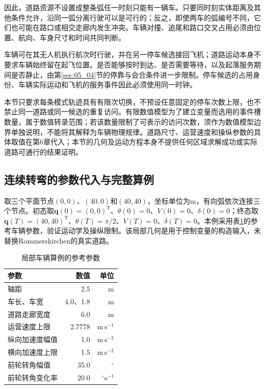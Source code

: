 因此，道路资源不设置成整条弧任一时刻只能有一辆车。只要同时刻实体距离及其他条件允许，沿同一弧分离行驶可以是可行的；反之，即使两车的弧编号不同，它们也可能在路口或相交走廊内发生冲突。车辆对撞、追尾和路口交叉占用必须由位置、航向、车身尺寸和时间共同判断。

车辆可在其无人机执行航次时行驶，并在另一停车候选接回飞机；道路运动本身不要求车辆始终留在起飞位置。是否能够按时到达、是否需要等待，以及起落服务期间是否静止，由第\ref{sec:05_04}节的停靠与会合条件进一步限制。停车候选的占用身份、车辆实际运动和飞机的服务事件因此必须使用同一时钟。

本节只要求每条模式轨迹具有有限次切换，不预设任意固定的停车次数上限，也不禁止同一道路或同一候选的重复访问。有限数值模型为了建立变量而选用的事件槽数量，属于数值转录范围；若该数量限制了可表示的访问次数，须作为数值模型边界单独说明，不能将其解释为车辆物理规律。道路尺寸、运营速度和操纵参数的具体取值在第6章代入；本节的几何及运动方程本身不提供任何区域求解成功或实际道路可通行的结果证明。

\subsection{连续转弯的参数代入与完整算例}

取三个平面节点$(0,0)$、$(40,0)$和$(40,40)$，坐标单位为$\mathrm m$，有向弧依次连接三个节点。初态取$\mathbf q(0)=(0,0)^{\mathsf T}$、$\theta(0)=0$、$V(0)=0$、$\delta(0)=0$；终态取$\mathbf q(T)=(40,40)^{\mathsf T}$、$\theta(T)=\pi/2$、$V(T)=0$、$\delta(T)=0$。本例采用表\ref{s0407:numeric_parameters}的参考车辆参数，验证运动学及操纵限制。该局部几何是用于控制变量的构造输入，未替换Rommerskirchen的真实道路。

\begin{table}[htbp]
\centering\small
\caption{局部车辆算例的参考参数}
\label{s0407:numeric_parameters}
\begin{tabular}{@{}lrr@{}}
\toprule
参数 & 数值 & 单位\\
\midrule
轴距 & 2.5 & m\\
车长、车宽 & 4.0、1.8 & m\\
道路走廊宽度 & 6.0 & m\\
运营速度上限 & 2.7778 & $\mathrm{m\,s^{-1}}$\\
纵向加速度幅值 & 1.0 & $\mathrm{m\,s^{-2}}$\\
横向加速度上限 & 1.5 & $\mathrm{m\,s^{-2}}$\\
前轮转角幅值 & 35.0 & $^{\circ}$\\
前轮转角变化率 & 20.0 & $^{\circ}\mathrm{s^{-1}}$\\
\bottomrule
\end{tabular}
\end{table}

